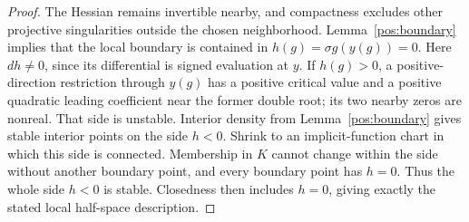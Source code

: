 \documentclass[reqno]{amsart}
\theoremstyle{definition}
\theoremstyle{remark}
\begin{document}
\begin{proof}
The Hessian remains invertible nearby, and compactness excludes other projective
singularities outside the chosen neighborhood.  Lemma~\ref{pos:boundary} implies
that the local boundary is contained in \(h(g)=\sigma g(y(g))=0\).
Here \(dh\ne0\), since its differential is signed evaluation at \(y\).
If \(h(g)>0\), a positive-direction restriction through \(y(g)\) has a positive
critical value and a positive quadratic leading coefficient near the former
double root; its two nearby zeros are nonreal.  That side is unstable.
Interior density from Lemma~\ref{pos:boundary} gives stable interior points on
the side \(h<0\).  Shrink to an implicit-function chart in which this side is
connected.  Membership in \(K\) cannot change within the side without another
boundary point, and every boundary point has \(h=0\).
Thus the whole side \(h<0\) is stable.  Closedness then includes \(h=0\), giving
exactly the stated local half-space description.
\end{proof}
\end{document}
